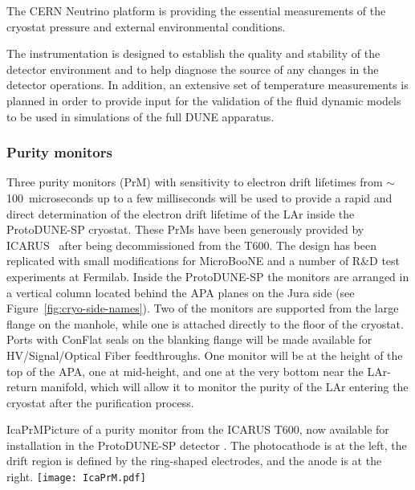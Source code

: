 The CERN Neutrino platform is providing the essential measurements of the cryostat pressure and external environmental conditions.

The instrumentation is designed to establish the quality and stability of the detector environment and to help diagnose the source of any changes in the detector operations. In addition, an extensive set of temperature measurements is planned in order to provide input for the validation of the fluid dynamic models to be used in simulations of the full DUNE apparatus.


\subsubsection{Purity monitors} 
Three purity monitors (PrM) with sensitivity
to electron drift lifetimes from $\sim$100~microseconds up to a few milliseconds
will be used to provide a rapid and direct determination of the 
electron drift lifetime
of the LAr inside the ProtoDUNE-SP cryostat. These PrMs have been generously provided by ICARUS~\cite{Amerio:2004ze} 
after being decommissioned from the T600. 
The design has been replicated with small modifications
for MicroBooNE and 
a number of  R\&D test experiments at Fermilab. Inside the ProtoDUNE-SP the monitors are arranged in a vertical 
column
located behind the APA planes on the Jura side (see Figure~\ref{fig:cryo-side-names}). 
Two of the monitors are supported from the large flange on the manhole, while one is attached directly to the floor of the cryostat.
Ports
 with ConFlat seals on the blanking flange will be made available for
 HV/Signal/Optical Fiber feedthroughs.
 One monitor will be at the height of the top of the APA,
 one at mid-height, and one at the very bottom near the LAr-return manifold, %
which will allow it to monitor
the purity of the LAr entering the cryostat after the purification process.  

\begin{cdrfigure}{IcaPrM}{Picture of a purity monitor from the ICARUS T600, now available for installation in the ProtoDUNE-SP detector
. The photocathode is at the left, the drift region is defined by the ring-shaped electrodes, and the anode is at the right.}
\texttt{[image: IcaPrM.pdf]} 
\end{cdrfigure}

